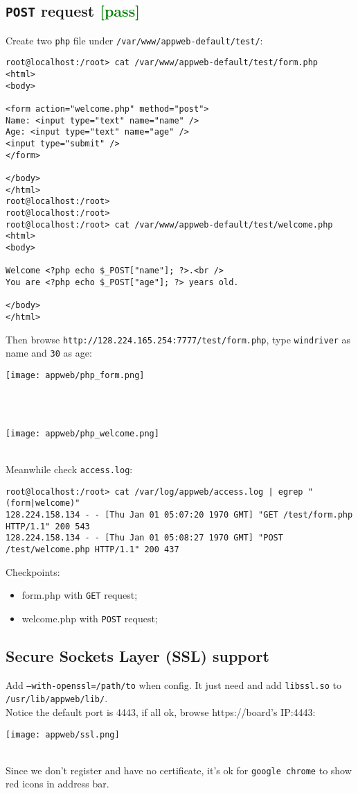 \documentclass[a4paper]{report}
\begin{document}
\subsection{{\tt POST} request \textcolor{green}{[pass]}}
Create two {\tt php}
file under {\tt /var/www/appweb-default/test/}:
\begin{lstlisting}
root@localhost:/root> cat /var/www/appweb-default/test/form.php 
<html>
<body>

<form action="welcome.php" method="post">
Name: <input type="text" name="name" />
Age: <input type="text" name="age" />
<input type="submit" />
</form>

</body>
</html>
root@localhost:/root> 
root@localhost:/root> 
root@localhost:/root> cat /var/www/appweb-default/test/welcome.php 
<html>
<body>

Welcome <?php echo $_POST["name"]; ?>.<br />
You are <?php echo $_POST["age"]; ?> years old.

</body>
</html>

\end{lstlisting}
Then browse {\tt http://128.224.165.254:7777/test/form.php}, type {\tt windriver}
as name and {\tt 30} as age:
\\[\intextsep]
\begin{minipage}{\textwidth}
\centering
\texttt{[image: appweb/php\_form.png]}
\end{minipage}
\\[\intextsep]
\\[\intextsep]
\begin{minipage}{\textwidth}
\centering
\texttt{[image: appweb/php\_welcome.png]}
\end{minipage}
\\[\intextsep]
Meanwhile check {\tt access.log}:
\begin{lstlisting}
root@localhost:/root> cat /var/log/appweb/access.log | egrep "(form|welcome)"
128.224.158.134 - - [Thu Jan 01 05:07:20 1970 GMT] "GET /test/form.php HTTP/1.1" 200 543
128.224.158.134 - - [Thu Jan 01 05:08:27 1970 GMT] "POST /test/welcome.php HTTP/1.1" 200 437
\end{lstlisting}
Checkpoints:
\begin{itemize}
    \item {form.php} with {\tt GET} request;
    \item {welcome.php} with {\tt POST} request;
\end{itemize}
\subsection{Secure Sockets Layer (SSL) support}
Add {\tt --with-openssl=/path/to} when config.
It just need and add {\tt libssl.so} to {\tt /usr/lib/appweb/lib/}.\\
Notice the default port is 4443, if all ok, browse {https://board's IP:4443}:
\\[\intextsep]
\begin{minipage}{\textwidth}
\centering
\texttt{[image: appweb/ssl.png]}
\end{minipage}
\\[\intextsep]
Since we don't register and have no certificate, it's ok for {\tt google chrome} to show
red icons in address bar.
\end{document}
